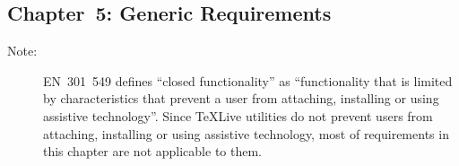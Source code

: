 \documentclass[titlepage]{article}
\newlength\vpatnumcollen
\begin{document}
\subsection{Chapter~5: Generic Requirements}
\label{sec:EN301-5}

\begin{description}
\item[Note:] EN~301~549 defines ``closed functionality'' as
  ``functionality that is limited by characteristics that prevent a
  user from attaching, installing or using assistive technology''.
  Since \TeX Live utilities do not prevent users from attaching,
  installing or using assistive technology, most of requirements in
  this chapter are not applicable to them.
\end{description}

\settowidth{} 
\end{document}
